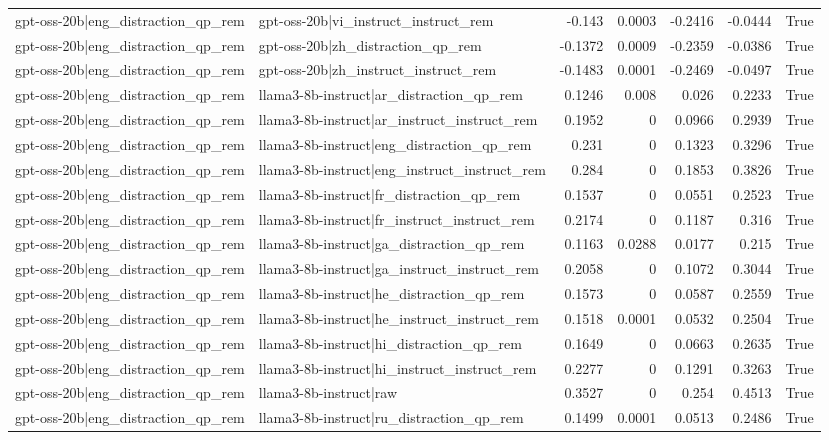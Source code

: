 \begin{table}
\begin{tabular}{l l r r r r l}
gpt-oss-20b|eng_distraction_qp_rem & gpt-oss-20b|vi_instruct_instruct_rem & -0.143 & 0.0003 & -0.2416 & -0.0444 & True \\
gpt-oss-20b|eng_distraction_qp_rem & gpt-oss-20b|zh_distraction_qp_rem & -0.1372 & 0.0009 & -0.2359 & -0.0386 & True \\
gpt-oss-20b|eng_distraction_qp_rem & gpt-oss-20b|zh_instruct_instruct_rem & -0.1483 & 0.0001 & -0.2469 & -0.0497 & True \\
gpt-oss-20b|eng_distraction_qp_rem & llama3-8b-instruct|ar_distraction_qp_rem & 0.1246 & 0.008 & 0.026 & 0.2233 & True \\
gpt-oss-20b|eng_distraction_qp_rem & llama3-8b-instruct|ar_instruct_instruct_rem & 0.1952 & 0 & 0.0966 & 0.2939 & True \\
gpt-oss-20b|eng_distraction_qp_rem & llama3-8b-instruct|eng_distraction_qp_rem & 0.231 & 0 & 0.1323 & 0.3296 & True \\
gpt-oss-20b|eng_distraction_qp_rem & llama3-8b-instruct|eng_instruct_instruct_rem & 0.284 & 0 & 0.1853 & 0.3826 & True \\
gpt-oss-20b|eng_distraction_qp_rem & llama3-8b-instruct|fr_distraction_qp_rem & 0.1537 & 0 & 0.0551 & 0.2523 & True \\
gpt-oss-20b|eng_distraction_qp_rem & llama3-8b-instruct|fr_instruct_instruct_rem & 0.2174 & 0 & 0.1187 & 0.316 & True \\
gpt-oss-20b|eng_distraction_qp_rem & llama3-8b-instruct|ga_distraction_qp_rem & 0.1163 & 0.0288 & 0.0177 & 0.215 & True \\
gpt-oss-20b|eng_distraction_qp_rem & llama3-8b-instruct|ga_instruct_instruct_rem & 0.2058 & 0 & 0.1072 & 0.3044 & True \\
gpt-oss-20b|eng_distraction_qp_rem & llama3-8b-instruct|he_distraction_qp_rem & 0.1573 & 0 & 0.0587 & 0.2559 & True \\
gpt-oss-20b|eng_distraction_qp_rem & llama3-8b-instruct|he_instruct_instruct_rem & 0.1518 & 0.0001 & 0.0532 & 0.2504 & True \\
gpt-oss-20b|eng_distraction_qp_rem & llama3-8b-instruct|hi_distraction_qp_rem & 0.1649 & 0 & 0.0663 & 0.2635 & True \\
gpt-oss-20b|eng_distraction_qp_rem & llama3-8b-instruct|hi_instruct_instruct_rem & 0.2277 & 0 & 0.1291 & 0.3263 & True \\
gpt-oss-20b|eng_distraction_qp_rem & llama3-8b-instruct|raw & 0.3527 & 0 & 0.254 & 0.4513 & True \\
gpt-oss-20b|eng_distraction_qp_rem & llama3-8b-instruct|ru_distraction_qp_rem & 0.1499 & 0.0001 & 0.0513 & 0.2486 & True \\

\end{tabular}
\end{table}
